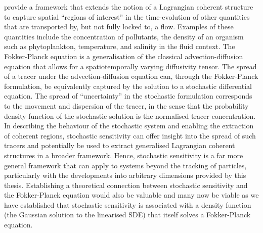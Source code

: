 \citet{BalasuriyaEtAl_2018_GeneralizedLagrangianCoherent} provide a framework that extends the notion of a Lagrangian coherent structure to capture spatial ``regions of interest'' in the time-evolution of other quantities that are transported by, but not fully locked to, a flow.
Examples of these quantities include the concentration of pollutants, the density of an organism such as phytoplankton, temperature, and salinity in the fluid context.
The Fokker-Planck equation is a generalisation of the classical advection-diffusion equation that allows for a spatiotemporally varying diffusivity tensor.
The spread of a tracer under the advection-diffusion equation can, through the Fokker-Planck formulation, be equivalently captured by the solution to a stochastic differential equation.
The spread of ``uncertainty'' in the stochastic formulation corresponds to the movement and dispersion of the tracer, in the sense that the probability density function of the stochastic solution is the normalised tracer concentration.
In describing the behaviour of the stochastic system and enabling the extraction of coherent regions, stochastic sensitivity can offer insight into the spread of such tracers and potentially be used to extract generalised Lagrangian coherent structures in a broader framework.
Hence, stochastic sensitivity is a far more general framework that can apply to systems beyond the tracking of particles, particularly with the developments into arbitrary dimensions provided by this thesis.
Establishing a theoretical connection between stochastic sensitivity and the Fokker-Planck equation would also be valuable \citep{Balasuriya_2020_StochasticApproachesLagrangian} and many now be viable as we have established that stochastic sensitivity is associated with a density function (the Gaussian solution to the linearised SDE) that itself solves a Fokker-Planck equation.


